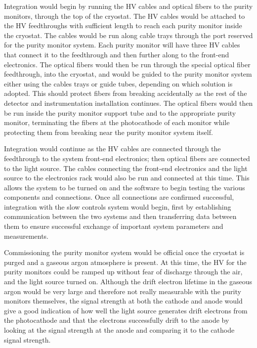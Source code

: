 Integration would begin by running the HV cables and optical fibers to the purity monitors, through the top of the cryostat.  The HV cables would be attached to the HV feedthroughs with sufficient length to reach each purity monitor inside the cryostat.  
The cables would be run along cable trays through the port reserved for the purity monitor system. 
Each purity monitor will have three HV cables that connect it to the feedthrough and then further along to the front-end electronics.  The optical fibers would then be run through the special optical fiber feedthrough, into the cryostat, and would be guided to the purity monitor system either using the cables trays or guide tubes, depending on which solution is adopted. 
This should protect fibers from breaking accidentally as the rest of the detector and instrumentation installation continues.  The optical fibers would then be run inside the purity monitor support tube and to the appropriate purity monitor, terminating the fibers at the photocathode of each monitor while protecting them from breaking near the purity monitor system itself.

Integration would continue as the HV cables are connected through the feedthrough to the system front-end electronics; then optical fibers are connected to the light source.  The cables connecting the front-end electronics and the light source to the electronics rack would also be run and connected at this time.  This allows the system to be turned on and the software to begin testing the various components and connections.  Once all connections are confirmed successful, integration with the slow controls system would begin, first by establishing communication between the two systems and then transferring data between them to ensure successful exchange of important system parameters and measurements.  

Commissioning the purity monitor system would be official once the cryostat is purged and a gaseous argon atmosphere is present.  At this time, the HV for the purity monitors could be ramped up without fear of discharge through the air, and the light source turned on.  Although the drift electron lifetime in the gaseous argon would be very large and therefore not really measurable with the purity monitors themselves, the signal strength at both the cathode and anode would give a good indication of how well the light source generates drift electrons from the photocathode and that the electrons successfully drift to the anode by looking at the signal strength at the anode and comparing it to the cathode signal strength.

